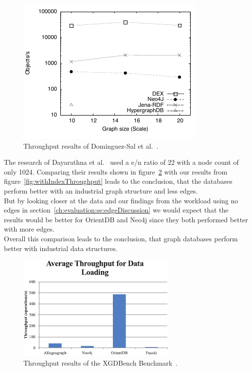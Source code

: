 \begin{figure}[!h]
  \centering
  \includegraphics[width=.8\textwidth]{images/benchmarks/ShenResultsInsert}
  \caption{Throughput results of Dominguez-Sal et al.~\cite{TaoShen}.}
  \label{fig:throughputShen}
\end{figure}

The research of Dayarathna et al.~\cite{Dayarathna2012} used a e/n ratio of 22 with a node count of only 1024.
Comparing their results shown in figure~\ref{fig:throughputXGDBench} with our results from figure~\ref{fig:withIndexThroughput} leads to the conclusion,
that the databases perform better with an industrial graph structure and less edges.\\
But by looking closer at the data and our findings from the workload using no edges in section~\ref{ch:evaluation:se:edgeDiscussion} we would expect that the results would be better for OrientDB and Neo4j since they both performed better with more edges.\\
Overall this comparison leads to the conclusion,
that graph databases perform better with industrial data structures.

\begin{figure}[!h]
  \centering
  \includegraphics[width=\textwidth]{images/benchmarks/XGDBenchResultsInsert}
  \caption{Throughput results of the XGDBench Benchmark~\cite{Dayarathna2012}.}
  \label{fig:throughputXGDBench}
\end{figure}

